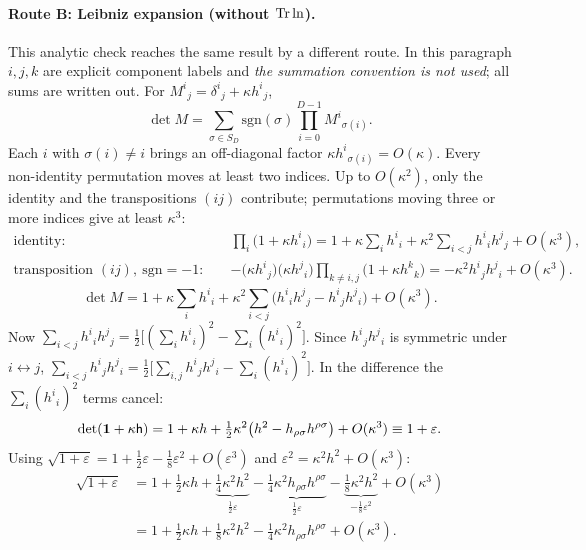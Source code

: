 \paragraph{Route B: Leibniz expansion (without $\operatorname{Tr}\ln$).}
\label{sec:ch1-t1-leibniz}
This analytic check reaches the same result by a different route. In this
paragraph $i,j,k$ are explicit component labels and \emph{the summation
convention is not used}; all sums are written out. For
$M^i{}_j=\delta^i{}_j+\kappa h^i{}_j$,
\begin{equation*}
\det M=\sum_{\sigma\in S_D}\mathrm{sgn}(\sigma)\prod_{i=0}^{D-1}M^i{}_{\sigma(i)}.
\end{equation*}
Each $i$ with $\sigma(i)\neq i$ brings an off-diagonal factor
$\kappa h^i{}_{\sigma(i)}=O(\kappa)$. Every non-identity permutation moves at
least two indices. Up to $O(\kappa^2)$, only the identity and the
transpositions $(ij)$ contribute; permutations moving three or more indices
give at least $\kappa^3$:
\begin{equation*}
\begin{aligned}
\text{identity:}\quad&\prod_i\big(1+\kappa h^i{}_i\big)=1+\kappa\sum_ih^i{}_i+\kappa^2\sum_{i<j}h^i{}_ih^j{}_j+O(\kappa^3),\\
\text{transposition }(ij),\ \mathrm{sgn}=-1:\quad&-\big(\kappa h^i{}_j\big)\big(\kappa h^j{}_i\big)\prod_{k\neq i,j}\big(1+\kappa h^k{}_k\big)=-\kappa^2h^i{}_jh^j{}_i+O(\kappa^3).
\end{aligned}
\end{equation*}
\begin{equation}
\det M=1+\kappa\sum_ih^i{}_i+\kappa^2\sum_{i<j}\big(h^i{}_ih^j{}_j-h^i{}_jh^j{}_i\big)+O(\kappa^3).
\label{eq:ch1-leibniz}
\end{equation}
Now $\sum_{i<j}h^i{}_ih^j{}_j=\tfrac12\big[(\sum_ih^i{}_i)^2-\sum_i(h^i{}_i)^2\big]$.
Since $h^i{}_jh^j{}_i$ is symmetric under $i\leftrightarrow j$,
$\sum_{i<j}h^i{}_jh^j{}_i=\tfrac12\big[\sum_{i,j}h^i{}_jh^j{}_i-\sum_i(h^i{}_i)^2\big]$.
In the difference the $\sum_i(h^i{}_i)^2$ terms cancel:
\begin{equation}
\det(\mathbf{1}+\kappa\mathsf{h})=1+\kappa h+\tfrac12\kappa^2\big(h^2-h_{\rho\sigma}h^{\rho\sigma}\big)+O(\kappa^3)\equiv1+\varepsilon.
\label{eq:ch1-det2}
\end{equation}
Using $\sqrt{1+\varepsilon}=1+\tfrac12\varepsilon-\tfrac18\varepsilon^2+O(\varepsilon^3)$
and $\varepsilon^2=\kappa^2h^2+O(\kappa^3)$:
\begin{equation}
\begin{aligned}
\sqrt{1+\varepsilon}&=1+\tfrac12\kappa h+\underbrace{\tfrac14\kappa^2h^2}_{\frac12\varepsilon}-\underbrace{\tfrac14\kappa^2h_{\rho\sigma}h^{\rho\sigma}}_{\frac12\varepsilon}-\underbrace{\tfrac18\kappa^2h^2}_{-\frac18\varepsilon^2}+O(\kappa^3)\\
&=1+\tfrac12\kappa h+\tfrac18\kappa^2h^2-\tfrac14\kappa^2h_{\rho\sigma}h^{\rho\sigma}+O(\kappa^3).
\end{aligned}
\label{eq:ch1-sqrt-leibniz}
\end{equation}
